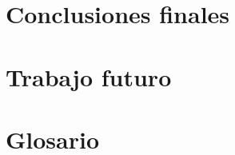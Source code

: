 \documentclass[a4paper, 11pt]{book}
\begin{document}
\begin{sloppypar}
\chapter{Conclusiones finales}


\chapter{Trabajo futuro}


\chapter{Glosario}






% 


% 


% 



% 
\end{sloppypar}
\end{document}
